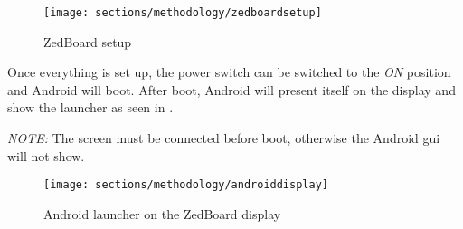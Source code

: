\begin{figure}[h]
\centering
\texttt{[image: sections/methodology/zedboardsetup]}
\caption{\label{fig:zedboardsetup} ZedBoard setup}
\end{figure}

Once everything is set up, the power switch can be switched to the \emph{ON}
position and Android will boot.
After boot, Android will present itself on the display and show the launcher
as seen in .

\emph{NOTE:} The screen must be connected before boot, otherwise the Android
\gls{gui} will not show.

\begin{figure}[h]
\centering
\texttt{[image: sections/methodology/androiddisplay]}
\caption{\label{fig:androiddisplay} Android launcher on the ZedBoard display}
\end{figure}
